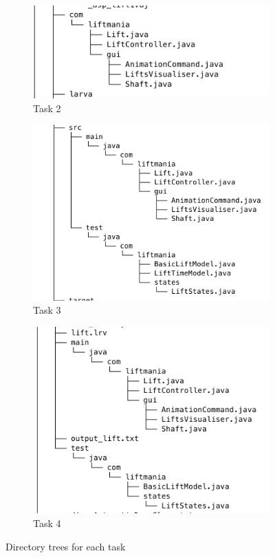 \documentclass[a4paper, 12pt]{article}
\begin{document}
\begin{figure}[h]
\centering
\begin{subfigure}{.5\textwidth}
  \centering
  \includegraphics[width=\linewidth]{images/task2-tree}
  \caption{Task 2}
\end{subfigure}%
\begin{subfigure}{.5\textwidth}
  \centering
  \includegraphics[width=\linewidth]{images/task3-tree}
  \caption{Task 3}
\end{subfigure}
\begin{subfigure}{.5\textwidth}
  \centering
  \includegraphics[width=\linewidth]{images/task4-tree}
  \caption{Task 4}
\end{subfigure}
\caption{Directory trees for each task}
\label{fig:directories-trees}
\end{figure}
\end{document}

